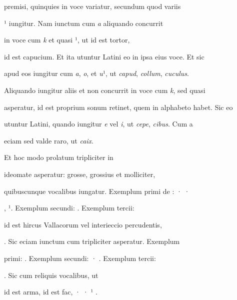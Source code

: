 premisi, quinquies in voce variatur, secundum quod variis 

¹ iungitur. Nam iunctum cum \textit{a} aliquando concurrit 

in voce cum \textit{k} et quasi ¹, ut  id est tortor,  


id est capucium. Et ita utuntur Latini eo in ipsa eius voce. Et sic 

apud eos iungitur cum \textit{a}, \textit{o}, et \textit{u}¹, ut \textit{capud}, \textit{collum}, \textit{cuculus}. 

Aliquando iungitur aliis et non concurrit in voce cum \textit{k}, sed quasi 

asperatur, id est proprium sonum retinet, quem in alphabeto habet. Sic eo 

utuntur Latini, quando iungitur \textit{e} vel \textit{i}, ut \textit{cepe}, \textit{cibus}. Cum a 

\splitlines
eciam sed valde raro, ut \textit{caix}.

\indentK Et hoc modo prolatum tripliciter in 

\fulllines

 ideomate asperatur: grosse, grossius et molliciter, 

quibuscunque vocalibus iungatur. Exemplum primi de : · · 

, ¹. Exemplum secundi:   . Exemplum tercii: 

  id est hircus Vallacorum vel interieccio percudentis, 

 . Sic eciam iunctum cum  tripliciter asperatur. Exemplum 

primi:  . Exemplum secundi: · . Exemplum tercii: 

 . Sic cum reliquis vocalibus, ut   

 id est arma,  id est fac, · · ¹ . 

